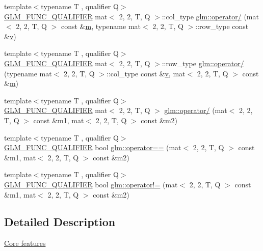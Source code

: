 \begin{DoxyCompactItemize}
\item 
{\footnotesize template$<$typename T , qualifier Q$>$ }\\\hyperlink{setup_8hpp_a33fdea6f91c5f834105f7415e2a64407}{G\+L\+M\+\_\+\+F\+U\+N\+C\+\_\+\+Q\+U\+A\+L\+I\+F\+I\+ER} mat$<$ 2, 2, T, Q $>$\+::col\+\_\+type \hyperlink{namespaceglm_a1371d2a3e665b5d05d78e7508cac0666}{glm\+::operator/} (mat$<$ 2, 2, T, Q $>$ const \&\hyperlink{_s_d_l__opengl__glext_8h_af593500c283bf1a787a6f947f503a5c2}{m}, typename mat$<$ 2, 2, T, Q $>$\+::row\+\_\+type const \&\hyperlink{_s_d_l__opengl_8h_a10a82eabcb59d2fcd74acee063775f90}{v})
\item 
{\footnotesize template$<$typename T , qualifier Q$>$ }\\\hyperlink{setup_8hpp_a33fdea6f91c5f834105f7415e2a64407}{G\+L\+M\+\_\+\+F\+U\+N\+C\+\_\+\+Q\+U\+A\+L\+I\+F\+I\+ER} mat$<$ 2, 2, T, Q $>$\+::row\+\_\+type \hyperlink{namespaceglm_a4c38c0b03a459b89203c68cebaa2ab79}{glm\+::operator/} (typename mat$<$ 2, 2, T, Q $>$\+::col\+\_\+type const \&\hyperlink{_s_d_l__opengl_8h_a10a82eabcb59d2fcd74acee063775f90}{v}, mat$<$ 2, 2, T, Q $>$ const \&\hyperlink{_s_d_l__opengl__glext_8h_af593500c283bf1a787a6f947f503a5c2}{m})
\item 
{\footnotesize template$<$typename T , qualifier Q$>$ }\\\hyperlink{setup_8hpp_a33fdea6f91c5f834105f7415e2a64407}{G\+L\+M\+\_\+\+F\+U\+N\+C\+\_\+\+Q\+U\+A\+L\+I\+F\+I\+ER} mat$<$ 2, 2, T, Q $>$ \hyperlink{namespaceglm_a952a07cc4b69739af33e4531085a9cbf}{glm\+::operator/} (mat$<$ 2, 2, T, Q $>$ const \&m1, mat$<$ 2, 2, T, Q $>$ const \&m2)
\item 
{\footnotesize template$<$typename T , qualifier Q$>$ }\\\hyperlink{setup_8hpp_a33fdea6f91c5f834105f7415e2a64407}{G\+L\+M\+\_\+\+F\+U\+N\+C\+\_\+\+Q\+U\+A\+L\+I\+F\+I\+ER} bool \hyperlink{namespaceglm_a82a69bca4c840fba89832e0175eec274}{glm\+::operator==} (mat$<$ 2, 2, T, Q $>$ const \&m1, mat$<$ 2, 2, T, Q $>$ const \&m2)
\item 
{\footnotesize template$<$typename T , qualifier Q$>$ }\\\hyperlink{setup_8hpp_a33fdea6f91c5f834105f7415e2a64407}{G\+L\+M\+\_\+\+F\+U\+N\+C\+\_\+\+Q\+U\+A\+L\+I\+F\+I\+ER} bool \hyperlink{namespaceglm_aff8daab6db273abada3e120aedd93499}{glm\+::operator!=} (mat$<$ 2, 2, T, Q $>$ const \&m1, mat$<$ 2, 2, T, Q $>$ const \&m2)
\end{DoxyCompactItemize}


\subsection{Detailed Description}
\hyperlink{group__core}{Core features} 